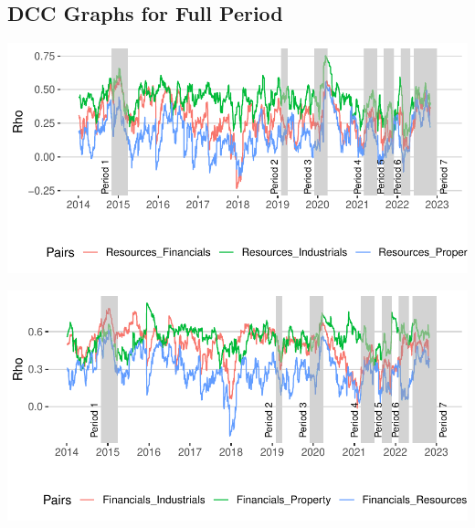 \documentclass[11pt,preprint, authoryear]{elsarticle}
\let\origfigure\figure
\let\endorigfigure\endfigure
\renewenvironment{figure}[1][2] {
    \expandafter\origfigure\expandafter[H]
} {
    \endorigfigure
}
\numberwithin{equation}{section}
\numberwithin{figure}{section}
\numberwithin{table}{section}
\begin{document}
\hypertarget{dcc-graphs-for-full-period}{%
\subsection{DCC Graphs for Full
Period}\label{dcc-graphs-for-full-period}}

\begin{figure}[H]

{\centering \includegraphics{Paper_files/figure-latex/DCCfullr-1} 

}

\caption{Dynamic Conditional Correlations: Resources \label{DCCfullr}}\label{fig:DCCfullr}
\end{figure}

\begin{figure}[H]

{\centering \includegraphics{Paper_files/figure-latex/DCCfullf-1} 

}

\caption{Dynamic Conditional Correlations: Financials \label{DCCfullf}}\label{fig:DCCfullf}
\end{figure}
\end{document}
